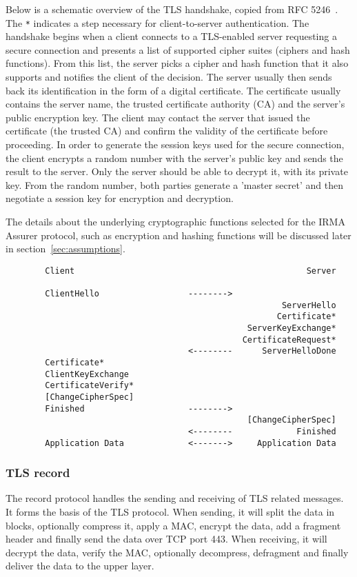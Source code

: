 Below is a schematic overview of the TLS handshake, copied from RFC 5246~\cite{tls1.2}. The \texttt{*} indicates a step necessary for client-to-server authentication. The handshake begins when a client connects to a TLS-enabled server requesting a secure connection and presents a list of supported cipher suites (ciphers and hash functions). From this list, the server picks a cipher and hash function that it also supports and notifies the client of the decision. The server usually then sends back its identification in the form of a digital certificate. The certificate usually contains the server name, the trusted certificate authority (CA) and the server's public encryption key. The client may contact the server that issued the certificate (the trusted CA) and confirm the validity of the certificate before proceeding. In order to generate the session keys used for the secure connection, the client encrypts a random number with the server's public key and sends the result to the server. Only the server should be able to decrypt it, with its private key. From the random number, both parties generate a 'master secret' and then negotiate a session key for encryption and decryption.

The details about the underlying cryptographic functions selected for the IRMA Assurer protocol, such as encryption and hashing functions will be discussed later in section~\ref{sec:assumptions}.
\begin{verbatim}
        Client                                               Server

        ClientHello                  -------->
                                                        ServerHello
                                                       Certificate*
                                                 ServerKeyExchange*
                                                CertificateRequest*
                                     <--------      ServerHelloDone
        Certificate*
        ClientKeyExchange
        CertificateVerify*
        [ChangeCipherSpec]
        Finished                     -------->
                                                 [ChangeCipherSpec]
                                     <--------             Finished
        Application Data             <------->     Application Data
\end{verbatim}


\subsubsection{TLS record}
The record protocol handles the sending and receiving of TLS related messages. It forms the basis of the TLS protocol. When sending, it will split the data in blocks, optionally compress it, apply a MAC, encrypt the data, add a fragment header and finally send the data over TCP port 443. When receiving, it will decrypt the data, verify the MAC, optionally decompress, defragment and finally deliver the data to the upper layer.

